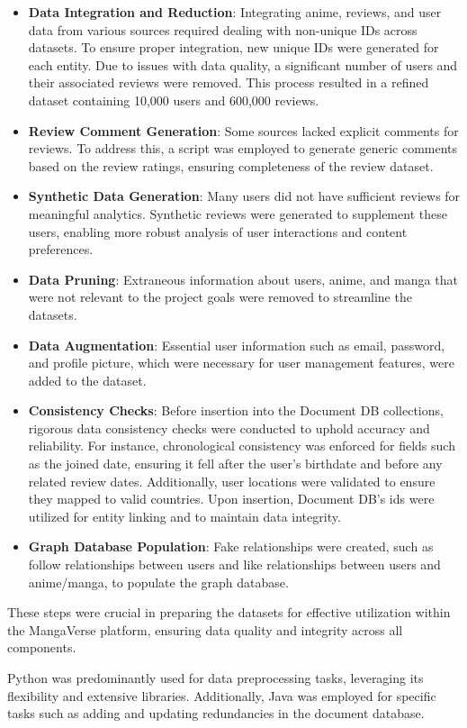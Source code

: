 \begin{itemize}
    \item \textbf{Data Integration and Reduction}: Integrating anime, reviews, and user data from various sources 
    required dealing with non-unique IDs across datasets. To ensure proper integration, 
    new unique IDs were generated for each entity. Due to issues with data quality, 
    a significant number of users and their associated reviews were removed. This process resulted in a 
    refined dataset containing 10,000 users and 600,000 reviews.
 
    \item \textbf{Review Comment Generation}: Some sources lacked explicit comments for reviews. To address this, 
    a script was employed to generate generic comments based on the review ratings, ensuring completeness of the review dataset.
    
    \item \textbf{Synthetic Data Generation}: Many users did not have sufficient reviews for meaningful analytics. 
    Synthetic reviews were generated to supplement these users, enabling more robust analysis 
    of user interactions and content preferences.
    
    \item \textbf{Data Pruning}: Extraneous information about users, anime, and manga that were 
    not relevant to the project goals were removed to streamline the datasets.
    
    \item \textbf{Data Augmentation}: Essential user information such as email, password, and profile picture, 
    which were necessary for user management features, were added to the dataset.
    
    \item \textbf{Consistency Checks}: Before insertion into the Document DB collections, rigorous data consistency checks were conducted to 
    uphold accuracy and reliability. For instance, chronological consistency was enforced for fields such as the joined date, 
    ensuring it fell after the user's birthdate and before any related review dates. Additionally, user locations were validated 
    to ensure they mapped to valid countries. Upon insertion, Document DB's ids were utilized for entity linking and to maintain data integrity.

    \item \textbf{Graph Database Population}: Fake relationships were created, such as follow relationships between users and like relationships 
    between users and anime/manga, to populate the graph database.
\end{itemize}

These steps were crucial in preparing the datasets for effective utilization within the MangaVerse platform, 
ensuring data quality and integrity across all components.

\vspace{\baselineskip}

Python was predominantly used for data preprocessing tasks, leveraging its flexibility and extensive libraries. 
Additionally, Java was employed for specific tasks such as adding and updating redundancies in the document database.